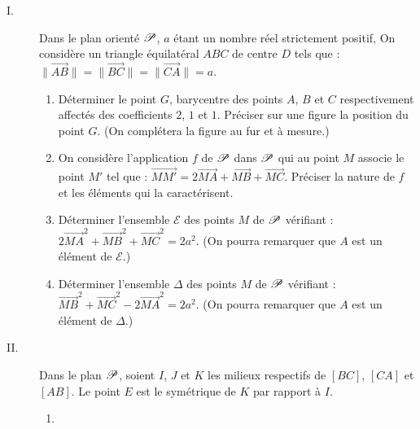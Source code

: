 \begin{exo}
      \begin{description}
            \item[I.]
                  Dans le plan orient\'e $\mathscr{P}$, $a$ \'etant un nombre r\'eel strictement positif,
                  On consid\`ere un triangle \'equilat\'eral $ABC$ de centre $D$ tels que :
                        $\|\overrightarrow{AB}\|=\|\overrightarrow{BC}\|=\|\overrightarrow{CA}\|=a$.
                  \begin{enumerate}
                        \item D\'eterminer le point $G$, barycentre des points $A$, $B$ et $C$
                              respectivement affect\'es des coefficients $2$, $1$ et $1$.
                              Pr\'eciser sur une figure la position du point $G$.
                              (On compl\'etera la figure au fur et \`a mesure.)
                        \item On consid\`ere l'application $f$ de $\mathscr{P}$ dans $\mathscr{P}$ qui 
                              au point $M$ associe le point $M'$ tel que :
                              $\overrightarrow{MM'} = 2 \overrightarrow{MA}+\overrightarrow{MB}+\overrightarrow{MC}$.
                              Pr\'eciser la nature de $f$ et les \'el\'ements qui la caract\'erisent.
                        \item D\'eterminer l'ensemble $\mathcal{E}$ des points $M$ de $\mathscr{P}$ v\'erifiant :
                              $2 \overrightarrow{MA}^2 + \overrightarrow{MB}^2 + \overrightarrow{MC}^2 = 2 a^2$.
                              (On pourra remarquer que $A$ est un \'el\'ement de $\mathcal{E}$.)
                        \item D\'eterminer l'ensemble $\Delta$ des points $M$ de $\mathscr{P}$ v\'erifiant :
                              $\overrightarrow{MB}^2 + \overrightarrow{MC}^2 - 2 \overrightarrow{MA}^2 = 2 a^2$.
                              (On pourra remarquer que $A$ est un \'el\'ement de $\Delta$.)
                  \end{enumerate}
            \item[II.] 
                  Dans le plan $\mathscr{P}$, soient $I$, $J$ et $K$ les milieux respectifs de
                  $[BC]$, $[CA]$ et $[AB]$.
                  Le point $E$ est le sym\'etrique de $K$ par rapport \`a $I$.
                  \begin{enumerate}
                        \item \begin{enumerate}

\end{enumerate}
\end{enumerate}
\end{description}
\end{exo}

